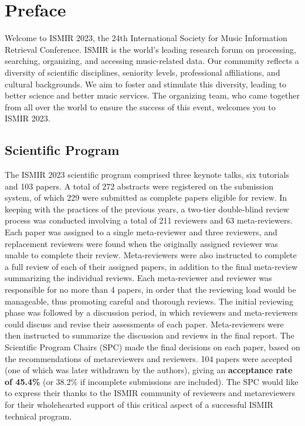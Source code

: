 \section*{Preface}

Welcome to ISMIR 2023, the 24th International Society for Music Information Retrieval Conference. ISMIR is the world’s leading research forum on processing, searching, organizing, and accessing music-related data. Our community reflects a diversity of scientific disciplines, seniority levels, professional affiliations, and cultural backgrounds. We aim to foster and stimulate this diversity, leading to better science and better music services. The organizing team, who came together from all over the world to ensure the success of this event, welcomes you to ISMIR 2023. 

\subsection*{Scientific Program}

The ISMIR 2023 scientific program comprised three keynote talks, six tutorials and 103 papers. A total of 272 abstracts were registered on the submission system, of which 229 were submitted as complete papers eligible for review. In keeping with the practices of the previous years, a two-tier double-blind review process was conducted involving a total of 211 reviewers and 63 meta-reviewers. Each paper was assigned to a single meta-reviewer and three reviewers, and replacement reviewers were found when the originally assigned reviewer was unable to complete their review. Meta-reviewers were also instructed to complete a full review of each of their assigned papers, in addition to the final meta-review summarizing the individual reviews. Each meta-reviewer and reviewer was responsible for no more than 4 papers, in order that the reviewing load would be manageable, thus promoting careful and thorough reviews. The initial reviewing phase was followed by a discussion period, in which reviewers and meta-reviewers could discuss and revise their assessments of each paper. Meta-reviewers were then instructed to summarize the discussion and reviews in the final report. The Scientific Program Chairs (SPC) made the final decisions on each paper, based on the recommendations of metareviewers and reviewers. 104 papers were accepted (one of which was later withdrawn by the authors), giving an \textbf{acceptance rate of 45.4\%} (or 38.2\% if incomplete submissions are included).  The SPC would like to express their thanks to the ISMIR community of reviewers and metareviewers for their wholehearted support of this critical aspect of a successful ISMIR technical program.

